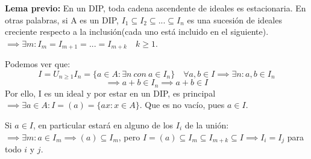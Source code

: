 \documentclass[11pt, a4paper, titlepage]{article}
\makeatletter
\renewenvironment{proof}[1][\proofname] {\vspace{-15pt}\par\pushQED{\qed}\normalfont\topsep6\p@\@plus6\p@\relax\trivlist\item[\hskip\labelsep\it#1\@addpunct{.}]\ignorespaces}{\popQED\endtrivlist\@endpefalse}
\theoremstyle{theorem-style}
\theoremstyle{definition-style}
\theoremstyle{remark-style}
\theoremstyle{example-style}
\makeatother
\begin{document}
	\textbf{Lema previo:} En un DIP, toda cadena ascendente de ideales es estacionaria. En otras palabras, si A es un DIP, $I_1 \subseteq I_2 \subseteq ... \subseteq I_{n}$ es una sucesión de ideales creciente respecto a la inclusión(cada uno está incluido en el siguiente). $\implies \exists m : I_m = I_{m+1} = ... = I_{m+k} \quad k \geq 1$.
	
	\begin{proof}[Demostración del lema.]
	Podemos ver que: 
	\[
	I = U_{n\geq 1} I_n = \{a \in A : \exists n \ con \ a \in I_n\} \quad \forall a,b \in I \implies \exists n: a,b \in I_n\]\[ \implies a+b \in I_n \implies a+b \in I
	\]
	Por ello, I es un ideal y por estar en un DIP, es principal $\implies \exists a \in A : I = (a) = \{ax : x \in A\}$. Que es no vacío, pues $a \in I$.
	
	Si $a\in I$, en particular estará en alguno de los $I_i$ de la unión: $\implies \exists m : a \in I_m \implies (a) \subseteq I_m$, pero  $I = (a) \subseteq I_m \subseteq I_{m+k} \subseteq I \implies I_i = I_j$ para todo $i$ y $j$. 
	
\end{proof}
\end{document}
